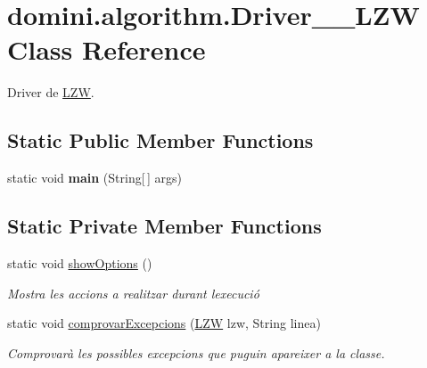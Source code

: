 \hypertarget{classdomini_1_1algorithm_1_1Driver____LZW}{}\section{domini.\+algorithm.\+Driver\+\_\+\+\_\+\+L\+ZW Class Reference}
\label{classdomini_1_1algorithm_1_1Driver____LZW}


Driver de \hyperlink{classdomini_1_1algorithm_1_1LZW}{L\+ZW}.  


\subsection*{Static Public Member Functions}
\begin{DoxyCompactItemize}
\item 
\mbox{\label{classdomini_1_1algorithm_1_1Driver____LZW_a1500b5c33b09cbaad4645f6d87eecc4c}} 
static void {\bfseries main} (String\mbox{[}$\,$\mbox{]} args)
\end{DoxyCompactItemize}
\subsection*{Static Private Member Functions}
\begin{DoxyCompactItemize}
\item 
\mbox{\label{classdomini_1_1algorithm_1_1Driver____LZW_ad43ebe1afd0d4e5be51584c71a1789d2}} 
static void \hyperlink{classdomini_1_1algorithm_1_1Driver____LZW_ad43ebe1afd0d4e5be51584c71a1789d2}{show\+Options} ()
\begin{DoxyCompactList}\small\item\em Mostra les accions a realitzar durant l\textquotesingle{}execució \end{DoxyCompactList}\item 
static void \hyperlink{classdomini_1_1algorithm_1_1Driver____LZW_a3f609a2c3a22d0c7d11a5ff4e015e433}{comprovar\+Excepcions} (\hyperlink{classdomini_1_1algorithm_1_1LZW}{L\+ZW} lzw, String linea)
\begin{DoxyCompactList}\small\item\em Comprovarà les possibles excepcions que puguin apareixer a la classe. \end{DoxyCompactList}\end{DoxyCompactItemize}


